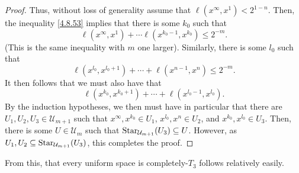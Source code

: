 \begin{thm}
\begin{savenotes}
\begin{proof}
Thus, without loss of generality assume that $\ell (x^\infty,x^1)<2^{1-n}$.  Then, the inequality \eqref{4.8.53} implies that there is some $k_0$ such that
\begin{equation}
\ell (x^\infty,x^1)+\cdots \ell (x^{k_0-1},x^{k_0})\leq 2^{-m}.
\end{equation}
(This is the same inequality with $m$ one larger).  Similarly, there is some $l_0$ such that
\begin{equation}
\ell (x^{l_0},x^{l_0+1})+\cdots +\ell (x^{n-1},x^n)\leq 2^{-m}.
\end{equation}
It then follows that we must also have that
\begin{equation}
\ell (x^{k_0},x^{k_0+1})+\cdots +\ell (x^{l_0-1},x^{l_0}).
\end{equation}
By the induction hypotheses, we then must have in particular that there are $U_1,U_2,U_3\in \mathcal{U}_{m+1}$ such that $x^\infty,x^{k_0}\in U_1$, $x^{l_0},x^n\in U_2$, and $x^{k_0},x^{l_0}\in U_3$.  Then, there is some $U\in \mathcal{U}_m$ such that $\operatorname{Star} _{\mathcal{U}_{m+1}}(U_3)\subseteq U$.  However, as $U_1,U_2\subseteq \operatorname{Star} _{\mathcal{U}_{m+1}}(U_3)$, this completes the proof.
\end{proof}
\end{savenotes}
\end{thm}
From this, that every uniform space is completely-$T_3$ follows relatively easily.
